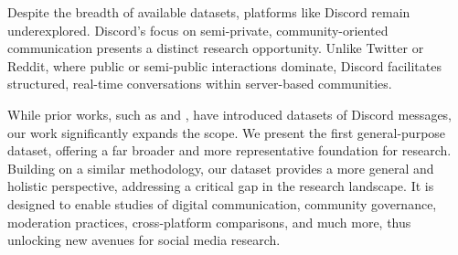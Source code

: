 Despite the breadth of available datasets, platforms like Discord remain underexplored. Discord’s focus on semi-private, community-oriented communication presents a distinct research opportunity. Unlike Twitter or Reddit, where public or semi-public interactions dominate, Discord facilitates structured, real-time conversations within server-based communities.

While prior works, such as \citet{Singh_Ghafouri_Such_Suarez-Tangil_2024} and \citet{10.1007/978-3-031-42171-6_5}, have introduced datasets of Discord messages, our work significantly expands the scope. We present the first general-purpose dataset, offering a far broader and more representative foundation for research. Building on a similar methodology, our dataset provides a more general and holistic perspective, addressing a critical gap in the research landscape. It is designed to enable studies of digital communication, community governance, moderation practices, cross-platform comparisons, and much more, thus unlocking new avenues for social media research.





